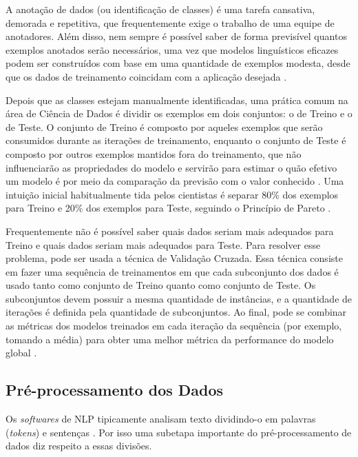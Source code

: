 A anotação de dados (ou identificação de classes) é uma tarefa cansativa, demorada e repetitiva, que frequentemente exige o trabalho de uma equipe de anotadores. Além disso, nem sempre é possível saber de forma previsível quantos exemplos anotados serão necessários, uma vez que modelos linguísticos eficazes podem ser construídos com base em uma quantidade de exemplos modesta, desde que os dados de treinamento coincidam com a aplicação desejada \cite{effects_of_corpus_size}.

Depois que as classes estejam manualmente identificadas, uma prática comum na área de Ciência de Dados é dividir os exemplos em dois conjuntos: o de Treino e o de Teste. O conjunto de Treino é composto por aqueles exemplos que serão consumidos durante as iterações de treinamento, enquanto o conjunto de Teste é composto por outros exemplos mantidos fora do treinamento, que não influenciarão as propriedades do modelo e servirão para estimar o quão efetivo um modelo é por meio da comparação da previsão com o valor conhecido \cite{data_science_handbook}. Uma intuição inicial habitualmente tida pelos cientistas é separar 80\% dos exemplos para Treino e 20\% dos exemplos para Teste, seguindo o Princípio de Pareto \cite{80_20}.

Frequentemente não é possível saber quais dados seriam mais adequados para Treino e quais dados seriam mais adequados para Teste. Para resolver esse problema, pode ser usada a técnica de Validação Cruzada. Essa técnica consiste em fazer uma sequência de treinamentos em que cada subconjunto dos dados é usado tanto como conjunto de Treino quanto como conjunto de Teste. Os subconjuntos devem possuir a mesma quantidade de instâncias, e a quantidade de iterações é definida pela quantidade de subconjuntos. Ao final, pode se combinar as métricas dos modelos treinados em cada iteração da sequência (por exemplo, tomando a média) para obter uma melhor métrica da performance do modelo global \cite{data_science_handbook}. 

\subsection{Pré-processamento dos Dados}
\label{pre-processamento dos dados}
Os \textit{softwares} de NLP tipicamente analisam texto dividindo-o em palavras (\textit{tokens}) e sentenças \cite{practical_nlp}. Por isso uma subetapa importante do pré-processamento de dados diz respeito a essas divisões. 

